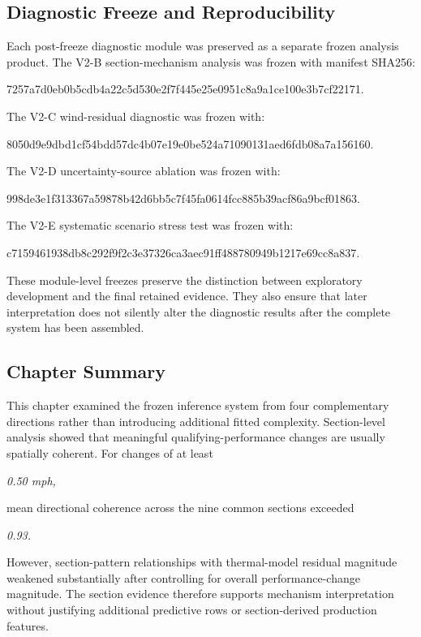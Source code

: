 \subsection{Diagnostic Freeze and Reproducibility}
Each post-freeze diagnostic module was preserved as a separate frozen analysis product. The V2-B section-mechanism analysis was frozen with manifest SHA256:

7257a7d0eb0b5cdb4a22c5d530e2f7f445e25e0951c8a9a1ce100e3b7cf22171.

The V2-C wind-residual diagnostic was frozen with:

8050d9e9dbd1cf54bdd57dc4b07e19e0be524a71090131aed6fdb08a7a156160.

The V2-D uncertainty-source ablation was frozen with:

998de3e1f313367a59878b42d6bb5c7f45fa0614fcc885b39acf86a9bcf01863.

The V2-E systematic scenario stress test was frozen with:

c7159461938db8c292f9f2c3e37326ca3aec91ff488780949b1217e69cc8a837.

These module-level freezes preserve the distinction between exploratory development and the final retained evidence. They also ensure that later interpretation does not silently alter the diagnostic results after the complete system has been assembled.

\subsection{Chapter Summary}
This chapter examined the frozen inference system from four complementary directions rather than introducing additional fitted complexity. Section-level analysis showed that meaningful qualifying-performance changes are usually spatially coherent. For changes of at least

\begin{center}\textit{0.50 mph,}\end{center}

mean directional coherence across the nine common sections exceeded

\begin{center}\textit{0.93.}\end{center}

However, section-pattern relationships with thermal-model residual magnitude weakened substantially after controlling for overall performance-change magnitude. The section evidence therefore supports mechanism interpretation without justifying additional predictive rows or section-derived production features.

